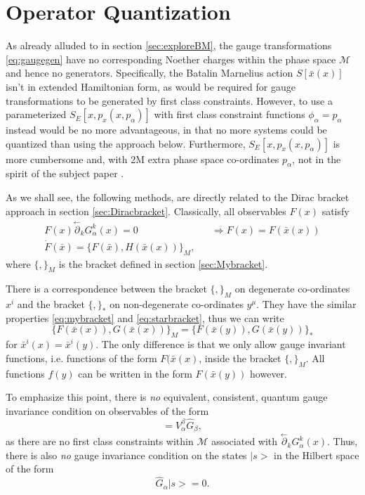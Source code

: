 \documentclass[a4paper,12pt]{article}
\theoremstyle{definition}
\theoremstyle{remark}
\numberwithin{equation}{section}
\newcommand{\al}{\alpha}
\newcommand{\be}{\beta}
\newcommand{\Imp}{\Rightarrow}
\newcommand{\M}{\mathcal{M}}
\newcommand{\bx}{\bar{x}}
\newcommand{\pl}{\overset{\leftarrow}{\partial}}
\begin{document}
\section{Operator Quantization} \label{sec:operator}

As already alluded to in section \ref{sec:exploreBM}, the gauge
transformations \eqref{eq:gaugegen} have no corresponding Noether
charges within the phase space $\M$ and hence no generators.
Specifically, the Batalin Marnelius action $S[\bx(x)]$ isn't in
extended Hamiltonian form, as would be required for gauge
transformations to be generated by first class constraints.
However, to use a parameterized $S_E[x,p_x(x,p_\al)]$ with first
class constraint functions $\phi_{\al}=p_\al$ instead would be no
more advantageous, in that no more systems could be quantized than
using the approach below. Furthermore, $S_E[x,p_x(x,p_\al)]$ is
more cumbersome and, with 2M extra phase space co-ordinates
$p_\al$, not in the spirit of the subject paper
\cite{Batalin:2001hs}.

As we shall see, the following methods, are directly related to
the Dirac bracket approach in section \ref{sec:Diracbracket}.
Classically, all observables $F(x)$ satisfy
\begin{eqnarray}
F(x)\pl_k G^k_{\al}(x)=0 && \Imp F(x)=F(\bx(x))\\
\dot{F}(\bx)=\{F(\bx),H(\bx(x))\}_M,
\end{eqnarray}
where $\{,\}_M$ is the bracket defined in section
\ref{sec:Mybracket}.

There is a correspondence between the bracket $\{,\}_M$ on
degenerate co-ordinates $x^i$ and the bracket $\{,\}_*$ on
non-degenerate co-ordinates $y^\mu$. They have the similar
properties \eqref{eq:mybracket} and \eqref{eq:starbracket}, thus we
can write
\begin{equation}\label{eq:linkxy}
\{F(\bx(x)),G(\bx(x))\}_M= \{F(\bx(y)),G(\bx(y))\}_*
\end{equation}
for $\bx^i(x)=\bx^i(y)$. The only difference is that we only
allow gauge invariant functions, i.e. functions of the form
$F(\bx(x)$, inside the bracket $\{,\}_M$. All functions $f(y)$ can
be written in the form $F(\bx(y))$ however.


To emphasize this point, there is \textit{no} equivalent,
consistent, quantum gauge invariance condition on observables of
the form
\begin{equation}
[\hat{F}(x),\hat{G}_{\al}(x)]=V_{\al}^{\be} \hat{G}_\be,
\end{equation}
as there are no first class constraints within $\M$ associated
with $\pl_k G^k_{\al}(x)$. Thus, there is also \textit{no} gauge
invariance condition on the states $|s>$ in the Hilbert space of
the form
\begin{equation}
\hat{G}_{\al}|s>=0.
\end{equation}
\end{document}
